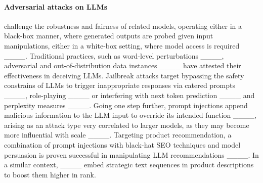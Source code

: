 \paragraph{Adversarial attacks on LLMs} challenge the robustness and fairness of related models, operating either in a black-box manner, where generated outputs are probed given input manipulations, either in a white-box setting, where model access is required ____. Traditional practices, such as word-level perturbations ____, adversarial and out-of-distribution data instances ____ have attested their effectiveness in deceiving LLMs. Jailbreak attacks target bypassing the safety constrains of LLMs to trigger inappropriate responses via catered prompts ____, role-playing ____ or interfering with next token prediction ____ and perplexity measures ____.
Going one step further, prompt injections append malicious information to the LLM input to override its intended function ____, arising as an attack type very correlated to larger models, as they may become more influential with scale ____. %
Targeting product recommendation, a combination of prompt injections with black-hat SEO techniques and model persuasion is proven successful in manipulating LLM recommendations ____. In a similar context, ____ embed strategic text sequences in product descriptions to boost them higher in rank.